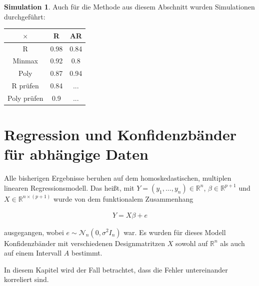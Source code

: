 \documentclass[12pt,a4paper]{article}
\theoremstyle{definition}
\theoremstyle{definition}
\theoremstyle{definition}
\newtheorem{Simulation}[Definition]{Simulation}
\theoremstyle{definition}
\newcommand{\UeberRR}{0.98}
\newcommand{\UeberRMinmax}{0.92}
\newcommand{\UeberRMinmaxPoly}{0.87}
\newcommand{\UeberARR}{0.84}
\newcommand{\UeberARMinmax}{0.8}
\newcommand{\UeberARMinmaxPoly}{0.94}
\newcommand{\UeberRRpruefen}{0.84}
\newcommand{\UeberRMinmaxPolypruefen}{0.9}
\newcommand{\UeberARRpruefen}{...}
\newcommand{\UeberARMinmaxPolypruefen}{...}
\begin{document}
\begin{Simulation}
Auch für die Methode aus diesem Abschnitt wurden Simulationen durchgeführt:

\begin{center}
\begin{tabular}{|c|c|c|}
\hline 
$\times$ & R & AR \\ 
\hline 
R		& \UeberRR			& \UeberARR \\ 
\hline 
Minmax	& \UeberRMinmax	 	& \UeberARMinmax \\ 
\hline 
Poly 	& \UeberRMinmaxPoly & \UeberARMinmaxPoly \\ 
\hline 
R prüfen	& \UeberRRpruefen & \UeberARRpruefen \\ 
\hline 
Poly prüfen	& \UeberRMinmaxPolypruefen & \UeberARMinmaxPolypruefen \\ 
\hline 
\end{tabular} 
\end{center}

\end{Simulation}





\newpage
\section{Regression und Konfidenzbänder für abhängige Daten}
\label{Regression und Konfidenzbänder für abhaengige Daten}
Alle bisherigen Ergebnisse beruhen auf dem homoskedastischen, multiplen linearen Regressionsmodell. Das heißt, mit $Y=(y_1, \ldots, y_n) \in \mathbb{R}^n$, $\beta \in \mathbb{R}^{p+1}$ und $X \in \mathbb{R}^{n \times (p+1)}$ wurde von dem funktionalem Zusammenhang

\begin{align} \label{Grundmodell_AR}
Y = X \beta + e
\end{align}

ausgegangen, wobei $e \sim \mathscr{N}_{n}(0, \sigma^2 I_n)$ war.  Es wurden für dieses Modell Konfidenzbänder mit verschiedenen Designmatritzen $X$ sowohl auf $\mathbb{R}^{n}$ als auch auf einem Intervall $A$ bestimmt.

In diesem Kapitel wird der Fall betrachtet, dass die Fehler untereinander korreliert sind. 
\end{document}
